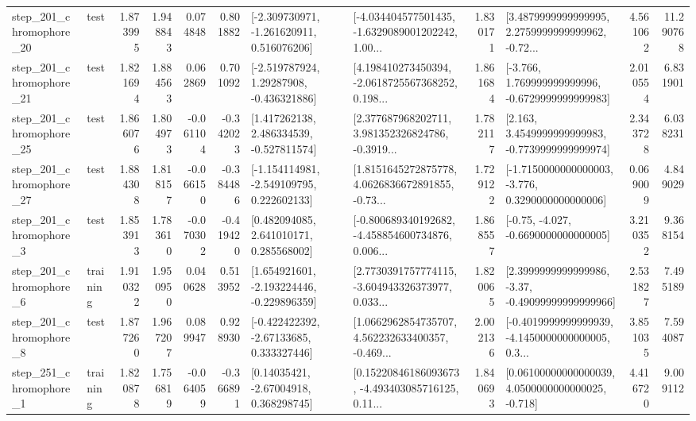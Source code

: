 \begin{tabular}{llrrrrllrlrr}
  step\_201\_chromophore\_20 &      test &      1.873995 &    1.948843 &      0.074848 &  0.801882 &   [-2.309730971, -1.261620911, 0.516076206] &  [-4.034404577501435, -1.6329089001202242, 1.00... &       1.830171 &  [3.4879999999999995, 2.2759999999999962, -0.72... &            4.561062 &         11.290768 \\
  step\_201\_chromophore\_21 &      test &      1.821694 &    1.884563 &      0.062869 &  0.701092 &    [-2.519787924, 1.29287908, -0.436321886] &  [4.198410273450394, -2.0618725567368252, 0.198... &       1.861684 &   [-3.766, 1.769999999999996, -0.6729999999999983] &            2.010554 &          6.831901 \\
  step\_201\_chromophore\_25 &      test &      1.866076 &    1.804973 &     -0.061104 & -0.342023 &    [1.417262138, 2.486334539, -0.527811574] &  [2.377687968202711, 3.981352326824786, -0.3919... &       1.782117 &   [2.163, 3.4549999999999983, -0.7739999999999974] &            2.343728 &          6.038231 \\
  step\_201\_chromophore\_27 &      test &      1.884308 &    1.818157 &     -0.066150 & -0.384486 &   [-1.154114981, -2.549109795, 0.222602133] &  [1.8151645272875778, 4.0626836672891855, -0.73... &       1.729122 &  [-1.7150000000000003, -3.776, 0.3290000000000006] &            0.069009 &          4.849029 \\
   step\_201\_chromophore\_3 &      test &      1.853913 &    1.783610 &     -0.070302 & -0.419420 &     [0.482094085, 2.641010171, 0.285568002] &  [-0.800689340192682, -4.458854600734876, 0.006... &       1.868557 &               [-0.75, -4.027, -0.6690000000000005] &            3.210352 &          9.368154 \\
   step\_201\_chromophore\_6 &  training &      1.910322 &    1.950950 &      0.040628 &  0.513952 &   [1.654921601, -2.193224446, -0.229896359] &  [2.7730391757774115, -3.604943326373977, 0.033... &       1.820065 &  [2.3999999999999986, -3.37, -0.49099999999999966] &            2.531827 &          7.495189 \\
   step\_201\_chromophore\_8 &      test &      1.877260 &    1.967207 &      0.089947 &  0.928930 &    [-0.422422392, -2.67133685, 0.333327446] &  [1.0662962854735707, 4.562232633400357, -0.469... &       2.002136 &  [-0.4019999999999939, -4.1450000000000005, 0.3... &            3.851035 &          7.594087 \\
   step\_251\_chromophore\_1 &  training &      1.820878 &    1.756819 &     -0.064059 & -0.366891 &      [0.14035421, -2.67004918, 0.368298745] &  [0.15220846186093673, -4.493403085716125, 0.11... &       1.840693 &  [0.06100000000000039, 4.0500000000000025, -0.718] &            4.416720 &          9.009112 \\

\end{tabular}
